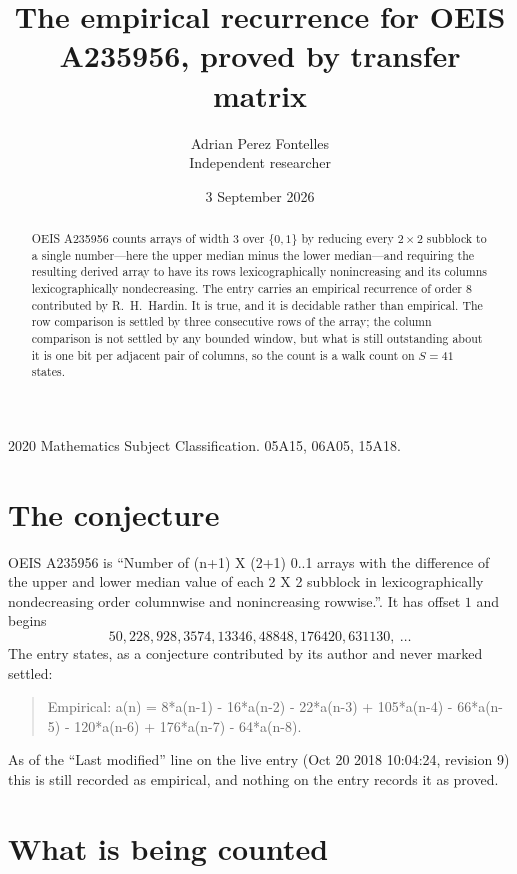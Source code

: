 \documentclass[11pt,a4paper]{article}
\title{The empirical recurrence for OEIS A235956, proved by transfer matrix}
\author{Adrian Perez Fontelles\\ \small Independent researcher}
\date{3 September 2026}
\theoremstyle{plain}
\theoremstyle{definition}
\begin{document}
\maketitle

\begin{abstract}
OEIS A235956 counts arrays of width $3$ over $\{0,1\}$ by reducing every $2\times2$ subblock to a
single number---here the upper median minus the lower median---and requiring the resulting derived array to have its rows
lexicographically nonincreasing and its columns lexicographically nondecreasing. The entry carries an
empirical recurrence of order $8$ contributed by R.~H.~Hardin. It is true, and it is
decidable rather than empirical. The row comparison is settled by three consecutive rows of the
array; the column comparison is not settled by any bounded window, but what is still outstanding
about it is one bit per adjacent pair of columns, so the count is a walk count on $S=41$
states.
\end{abstract}

\noindent\small 2020 Mathematics Subject Classification. 05A15, 06A05, 15A18.\normalsize

\section{The conjecture}

OEIS A235956 is ``Number of (n+1) X (2+1) 0..1 arrays with the difference of the upper and lower median value of each 2 X 2 subblock in lexicographically nondecreasing order columnwise and nonincreasing rowwise.''. It has offset $1$ and begins
\[
50, 228, 928, 3574, 13346, 48848, 176420, 631130,\ \dots
\]
The entry states, as a conjecture contributed by its author and never marked settled:
\begin{quote}
Empirical: a(n) = 8*a(n-1) - 16*a(n-2) - 22*a(n-3) + 105*a(n-4) - 66*a(n-5) - 120*a(n-6) + 176*a(n-7) - 64*a(n-8).
\end{quote}
As of the ``Last modified'' line on the live entry (Oct 20 2018 10:04:24, revision 9) this is still
recorded as empirical, and nothing on the entry records it as proved.

\section{What is being counted}
\end{document}
